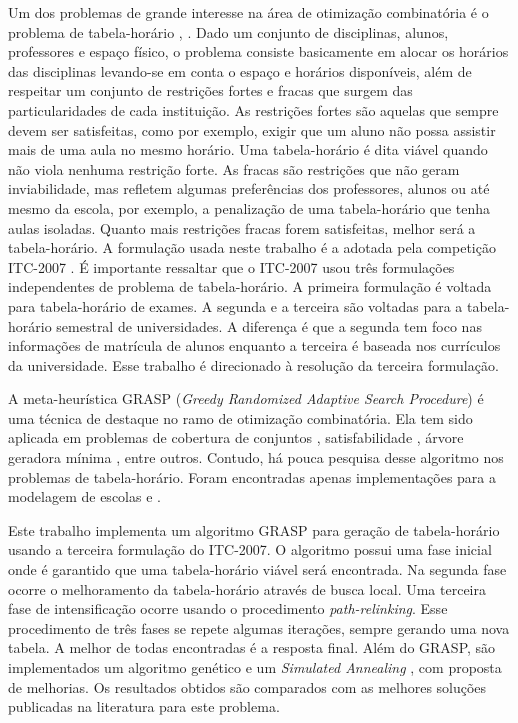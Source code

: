 \documentclass[11pt]{article}
\begin{document}
Um dos problemas de grande interesse na área de otimização combinatória é o problema de tabela-horário \cite{Schaerf95asurvey}, \cite{Lewis2007:survey}. Dado um conjunto de disciplinas, alunos, professores e espaço físico, o problema consiste basicamente em alocar os horários das disciplinas levando-se em conta o espaço e horários disponíveis, além de respeitar um conjunto de restrições fortes e fracas que surgem das particularidades de cada instituição. As restrições fortes são aquelas que sempre devem ser satisfeitas, como por exemplo, exigir que um aluno não possa assistir mais de uma aula no mesmo horário. Uma tabela-horário é dita viável quando não viola nenhuma restrição forte. As fracas são restrições que não geram inviabilidade, mas refletem algumas preferências dos professores, alunos ou até mesmo da escola, por exemplo, a penalização de uma tabela-horário que tenha aulas isoladas. Quanto mais restrições fracas forem satisfeitas, melhor será a tabela-horário. A formulação usada neste trabalho é a adotada pela competição ITC-2007 \cite{itc2007}. É importante ressaltar que o ITC-2007 usou três formulações independentes de problema de tabela-horário. A primeira formulação é voltada para tabela-horário de exames. A segunda e a terceira são voltadas para a tabela-horário semestral de universidades. A diferença é que a segunda tem foco nas informações de matrícula de alunos enquanto a terceira é baseada nos currículos da universidade. Esse trabalho é direcionado à resolução da terceira formulação.

A meta-heurística GRASP (\textit{Greedy Randomized Adaptive Search Procedure}) \cite{grasp_resende_ribeiro} é uma técnica de destaque no ramo de otimização combinatória. Ela tem sido aplicada em problemas de cobertura de conjuntos \cite{Res98}, satisfabilidade \cite{FesParPitRes06a}, árvore geradora mínima \cite{Souza02agrasp}, entre outros. Contudo, há pouca pesquisa desse algoritmo nos problemas de tabela-horário. Foram encontradas apenas implementações para a modelagem de escolas \cite{Souza:2004} e \cite{Vieira_agrasp}.

Este trabalho implementa um algoritmo GRASP para geração de tabela-horário usando a terceira formulação do ITC-2007. O algoritmo possui uma fase inicial onde é garantido que uma tabela-horário viável será encontrada. Na segunda fase ocorre o melhoramento da tabela-horário através de busca local. Uma terceira fase de intensificação ocorre usando o procedimento \textit{path-relinking}. Esse procedimento de três fases se repete algumas iterações, sempre gerando uma nova tabela. A melhor de todas encontradas é a resposta final. Além do GRASP, são implementados um algoritmo genético \cite{Goldberg:1989} e um \textit{Simulated Annealing} \cite{Kirkpatrick13051983}, com proposta de melhorias. Os resultados obtidos são comparados com as melhores soluções publicadas na literatura para este problema.
\end{document}
